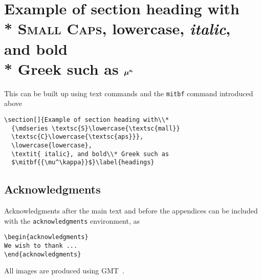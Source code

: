 \section[]{Example of section heading with\\*
  {\mdseries \textsc{S}\lowercase{\textsc{mall}}
  \textsc{C}\lowercase{\textsc{aps}}},
  \lowercase{lowercase},
  \textit{italic}, and bold\\* Greek such as
  $\mitbf{{\mu^\kappa}}$}\label{headings}

This can be built up using text commands and the \verb"mitbf" command introduced
above

\begin{verbatim}
\section[]{Example of section heading with\\*
  {\mdseries \textsc{S}\lowercase{\textsc{mall}}
  \textsc{C}\lowercase{\textsc{aps}}},
  \lowercase{lowercase},
  \textit{ italic}, and bold\\* Greek such as
  $\mitbf{{\mu^\kappa}}$}\label{headings}
\end{verbatim}

\subsection{Acknowledgments}
Acknowledgments after the main text and before the appendices can be included
with the \texttt{acknowledgments} environment, as
\begin{verbatim}
\begin{acknowledgments}
We wish to thank ...
\end{acknowledgments}
\end{verbatim}

\begin{acknowledgments}
All images are produced using GMT~\cite{W13}.
\end{acknowledgments}

